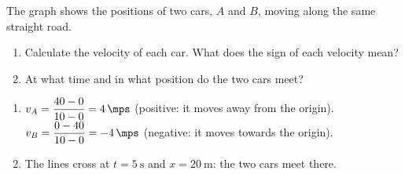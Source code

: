 \begin{exercise}
    The graph shows the positions of two cars, \(A\) and \(B\), moving along the same straight road.
    \begin{center}
    \end{center}
    \begin{enumerate}[label=\letraminuscula]
        \item Calculate the velocity of each car. What does the sign of each velocity mean?
        \item At what time and in what position do the two cars meet?
    \end{enumerate}
    \begin{solu}
        \begin{enumerate}[label=\alph*)]
            \item \(v_A = \dfrac{40 - 0}{10 - 0} = \qty{4}{\mps}\) (positive: it moves away from the origin). \(v_B = \dfrac{0 - 40}{10 - 0} = \qty{-4}{\mps}\) (negative: it moves towards the origin).
            \item The lines cross at \(t = \qty{5}{\s}\) and \(x = \qty{20}{\m}\): the two cars meet there.
        \end{enumerate}
    \end{solu}
\end{exercise}

